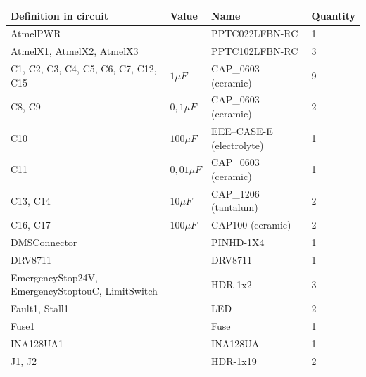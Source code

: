 \documentclass[a4paper,12pt]{scrreprt}
\begin{document}
\begin{table}[H]
\centering
\begin{tabular}{|p{5.5cm}|p{2cm}|p{5.3cm}|p{2cm}|}
\hline
\textbf{Definition in circuit            }               				     & \textbf{Value}  			& \textbf{Name}          & \textbf{Quantity} \\ \hline
AtmelPWR                                         				&        				& PPTC022LFBN-RC  & 1        \\ \hline
AtmelX1, AtmelX2, AtmelX3                        		&        				& PPTC102LFBN-RC  & 3        \\ \hline
C1, C2, C3, C4, C5, C6, C7, C12, C15              & $1 \mu F$   			& CAP\_0603  (ceramic)     & 9        \\ \hline
C8, C9                                           					& $0,1 \mu F$  			& CAP\_0603  (ceramic)     & 2        \\ \hline
C10                                             						& $100 \mu F$ 			& EEE--CASE-E (electrolyte)    & 1        \\ \hline
C11                                            						& $0,01 \mu F$ 			& CAP\_0603  (ceramic)      & 1        \\ \hline
C13, C14                                         					& $10 \mu F$   			& CAP\_1206   (tantalum)     & 2        \\ \hline
C16, C17                                         					& $100 \mu F$  			& CAP100      (ceramic)    & 2        \\ \hline
DMSConnector                                     				&        				& PINHD-1X4       & 1        \\ \hline
DRV8711                                          					&       			 	& DRV8711         & 1        \\ \hline
EmergencyStop24V, EmergencyStoptouC, LimitSwitch 				&        & HDR-1x2         & 3        \\ \hline 
Fault1, Stall1                                   					&        				& LED             & 2        \\ \hline
Fuse1                                            					&        				& Fuse            & 1        \\ \hline
INA128UA1                                        				&        				& INA128UA        & 1        \\ \hline
J1, J2                                           						&        				& HDR-1x19        & 2        \\ \hline

\end{tabular}
\end{table}
\end{document}

